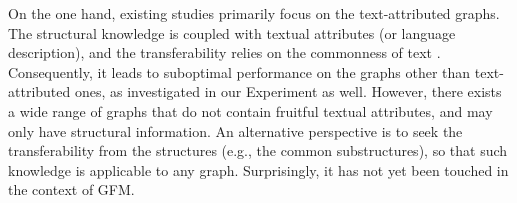 On the one hand, existing studies primarily focus on the text-attributed graphs.
The structural knowledge is coupled with textual attributes (or language description), and the transferability relies on the commonness of text \cite{icml24position}. 
Consequently, it leads to suboptimal performance on the graphs other than text-attributed ones, as investigated in our Experiment as well.
However,  there exists a wide range of graphs that do not contain fruitful textual attributes, and may only have structural information.
An alternative perspective is to seek the transferability from the structures  (e.g., the common substructures), so that such knowledge is applicable to any graph.
Surprisingly, it has not yet been touched in the context of GFM.






